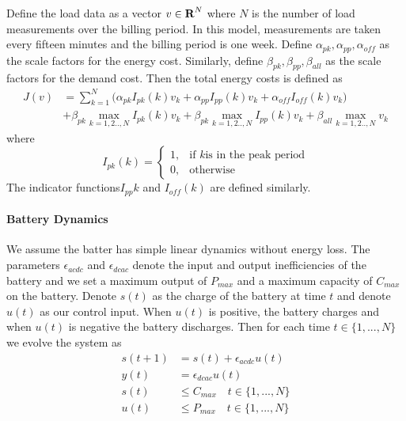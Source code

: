 \documentclass[12pt]{article}
\begin{document}
Define the load data as a vector $v \in {\mbox{\bf R}}^N$ where $N$ is the number of load measurements over the billing period. In this model, measurements are taken every fifteen minutes and the billing period is one week. Define $\alpha_{pk}, \alpha_{pp}, \alpha_{off}$ as the scale factors for the energy cost. Similarly, define $\beta_{pk}, \beta_{pp}, \beta_{all}$ as the scale factors for the demand cost. Then the total energy costs is defined as
\begin{equation}
\begin{split}
J(v) &= \sum_{k=1}^N \big( \alpha_{pk} I_{pk}(k)v_k + \alpha_{pp} I_{pp}(k)v_k+ \alpha_{off} I_{off}(k)v_k \big) \\
&+ \beta_{pk} \max_{k=1,2..,N} I_{pk}(k)v_k +\beta_{pk} \max_{k=1,2..,N} I_{pp}(k)v_k +\beta_{all} \max_{k=1,2..,N} v_k
\end{split}
\end{equation}
where
\begin{equation}\label{costfun}
I_{pk}(k)=
\begin{cases}
1,& \text{if } k \text{is in the peak period}\\
0, & \text{otherwise}
\end{cases}
\end{equation}
The indicator functions$ I_{pp}{k}$ and $I_{off}(k)$ are defined similarly.



\paragraph{Battery Dynamics}
We assume the batter has simple linear dynamics without energy loss. The parameters $\epsilon_{acdc}$ and $\epsilon_{dcac}$ denote the input and output inefficiencies of the battery and we set a maximum output of $P_{max}$ and a maximum capacity of $C_{max}$ on the battery. Denote $s(t)$ as the charge of the battery at time $t$ and denote $u(t)$ as our control input. When $u(t)$ is positive, the battery charges and when $u(t)$ is negative the battery discharges. Then for each time $t \in \{1,...,N\}$ we evolve the system as
\begin{equation}
\begin{split}
s(t+1) &= s(t) + \epsilon_{acdc} u(t) \\
y(t) &= \epsilon_{dcac} u(t) \\
s(t) & \leq C_{max} \quad t \in \{1,...,N\} \\
u(t) & \leq P_{max} \quad t \in \{1,...,N\}
\end{split}
\end{equation}
\end{document}
